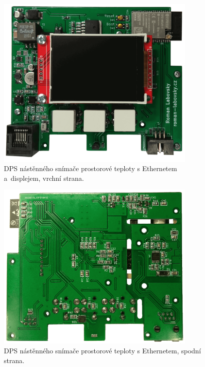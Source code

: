 \begin{figure}[H]
    \centering
    \includegraphics[width=0.88\textwidth]{images/nastenny-snimac-prostorove-teploty-ethernet/dps-nastenny-snimac-prostorove-teploty-ethernet-vrchni-cast-displej.png}
    \caption{DPS nástěnného snímače prostorové teploty s Ethernetem a~displejem, vrchní strana.}
    \label{fig:dps-nastenny-snimac-prostorove-teploty-ethernet-vrchni-cast-displej}
\end{figure}

\begin{figure}[H]
    \centering
    \includegraphics[width=0.88\textwidth]{images/nastenny-snimac-prostorove-teploty-ethernet/dps-nastenny-snimac-prostorove-teploty-ethernet-spodni-cast.png}
    \caption{DPS nástěnného snímače prostorové teploty s Ethernetem, spodní strana.}
    \label{fig:dps-nastenny-snimac-prostorove-teploty-ethernet-spodni-cast}
\end{figure}


